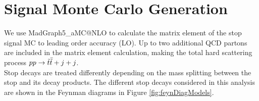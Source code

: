 \section{Signal Monte Carlo Generation}
\label{sec:MC:Sig}

\indent We use {\sc MadGraph5\_aMC\/@NLO} to calculate the matrix element of the stop signal MC to leading order accuracy (LO).\cite{Madgraph}  Up to two additional QCD partons are included in the matrix element calculation, making the total hard scattering process $pp \rightarrow {\ensuremath{\tilde{t}}}\bar{\tilde{t}} + j + j $.   \\

\indent Stop decays are treated differently depending on the mass splitting between the stop and its decay products.  The different stop decays considered in this analysis are shown in the Feynman diagrams in Figure \ref{fig:feynDiagModels}. \\

